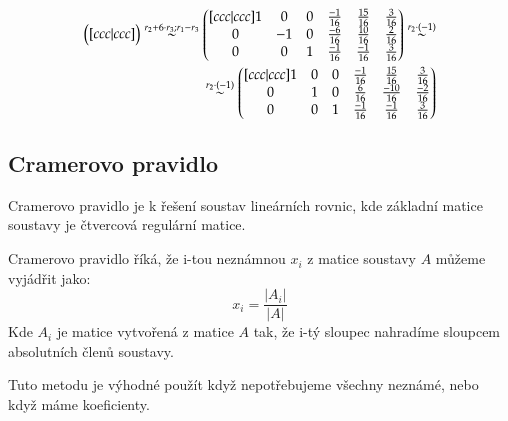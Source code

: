 \begin{example}
\begin{align*}
\begin{pmatrix}[ccc|ccc]
        \end{pmatrix} \overset{r_2 + 6 \cdot r_3; r_1 - r_3} \sim
        \begin{pmatrix}[ccc|ccc]
            1 & 0 & 0 & \frac{-1}{16} & \frac{15}{16} & \frac{3}{16}\\
            0 & -1 & 0 & \frac{-6}{16} & \frac{10}{16} & \frac{2}{16}\\
            0 & 0 & 1 & \frac{-1}{16} & \frac{-1}{16} & \frac{3}{16}
        \end{pmatrix} \overset{r_2 \cdot (-1)} \sim \\ \overset{r_2 \cdot (-1)} \sim
        \begin{pmatrix}[ccc|ccc]
            1 & 0 & 0 & \frac{-1}{16} & \frac{15}{16} & \frac{3}{16}\\
            0 & 1 & 0 & \frac{6}{16} & \frac{-10}{16} & \frac{-2}{16}\\
            0 & 0 & 1 & \frac{-1}{16} & \frac{-1}{16} & \frac{3}{16}
        \end{pmatrix}
    \end{align*}
\end{example}

\subsection{Cramerovo pravidlo}
Cramerovo pravidlo je k řešení soustav lineárních rovnic, kde základní matice soustavy je
čtvercová regulární matice.

Cramerovo pravidlo říká, že i-tou neznámnou $x_i$ z matice soustavy $A$ můžeme vyjádřit jako:
$$x_i = \frac{|A_i|}{|A|}$$
Kde $A_i$ je matice vytvořená z matice $A$ tak, že i-tý sloupec nahradíme sloupcem absolutních
členů soustavy.

Tuto metodu je výhodné použít když nepotřebujeme všechny neznámé, nebo když máme 
koeficienty.

